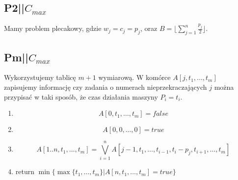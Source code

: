 \documentclass{../notatki}
\begin{document}
\subsection{P2||\texorpdfstring{$C_{max}$}{Cmax}}

Mamy problem plecakowy, gdzie $w_j = c_j = p_j$, oraz $B = \lfloor
\sum_{j=1}^{n} \frac{p_j}{2} \rfloor$.

\subsection{Pm||\texorpdfstring{$C_{max}$}{Cmax}}

Wykorzystujemy tablicę $m + 1$ wymiarową. W komórce $A[j, t_1, \dots,
t_m]$ zapisujemy informację czy zadania o numerach
nieprzekraczających $j$ można przypisać w taki sposób, że czas
działania maszyny $P_i = t_i$.

\begin{enumerate}
  \item $$
    A[0, t_1, \dots, t_m] = false
    $$
  \item $$
    A[0, 0, \dots, 0] = true
    $$
  \item $$
    A[1..n, t_1, \dots, t_m] =
    \bigvee_{i=1}^{n} A[j - 1, t_1, \dots, t_{i - 1}, t_i - p_j, t_{i
    + 1}, \dots, t_m]
    $$
  \item return $\min\{\max\{t_1, \dots, t_m\} | A[n, t_1, \dots, t_m] = true\}$
\end{enumerate}
\end{document}
